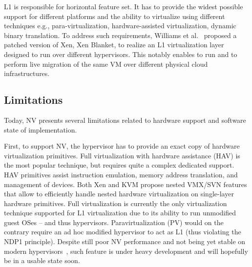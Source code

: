 \documentclass{sig-alternate}
\begin{document}
L1 is responsible for horizontal feature set. It has to provide the widest possible support for different platforms and the ability to virtualize using different techniques e.g., para-virtualization, hardware-assisted virtualization, dynamic binary translation. {\sffamily To address such requirements, Williams et al.~\cite{art:blan} proposed a patched version of Xen, Xen Blanket, to realize an L1 virtualization layer designed to run over different hypervisors. This notably enables to run and to perform live migration of the same VM over different physical cloud infrastructures.} %

\subsection{Limitations}

\noindent Today, NV presents several limitations related to hardware support {\sffamily and software state of implementation}. 

First, to support NV, the hypervisor has to provide an exact copy of hardware virtualization primitives. Full virtualization with hardware assistance (HAV) is the most popular technique, but requires quite a complex dedicated support.
HAV primitives assist instruction emulation, memory address translation, and management of devices. Both Xen and KVM propose {\sffamily nested VMX/SVN features} that allow to efficiently handle nested hardware virtualization on single-layer hardware primitives.
Full virtualization is currently the only virtualization technique supported for L1 virtualization due to its ability to run unmodified guest OSes -- and thus hypervisors. Paravirtualization (PV) would on the contrary require an ad hoc modified hypervisor to act as L1 (thus violating the NDP1 principle).
Despite still poor NV performance and not being yet stable on modern hypervisors~\cite{xen:test}, such feature is under heavy development and will hopefully be in a usable state soon.
\end{document}

